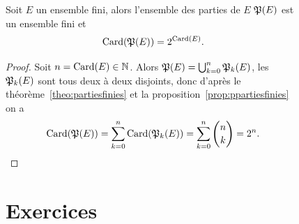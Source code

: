 \begin{figure}
\begin{prop}
  Soit \(E\) un ensemble fini, alors l'ensemble des parties de \(E\) \(\mathfrak{P}(E)\) est un ensemble fini et
  \begin{equation}
    \operatorname{Card}(\mathfrak{P}(E))=2^{\operatorname{Card}(E)}.
  \end{equation}
\end{prop}
\begin{proof}
  Soit \(n=\operatorname{Card}(E)\in \mathbb{N}\). Alors \(\mathfrak{P}(E)=\bigcup_{k=0}^{n}\mathfrak{P}_k(E)\), les \(\mathfrak{P}_k(E)\) sont tous deux à deux disjoints, donc d'après le théorème~\ref{theo:partiesfinies} et la proposition~\ref{prop:ppartiesfinies} on a
  \begin{equation}
    \operatorname{Card}(\mathfrak{P}(E))=\sum_{k=0}^n \operatorname{Card}(\mathfrak{P}_k(E))=\sum_{k=0}^n \binom{n}{k}=2^n.
  \end{equation}
\end{proof}
\section{Exercices}

\end{figure}
